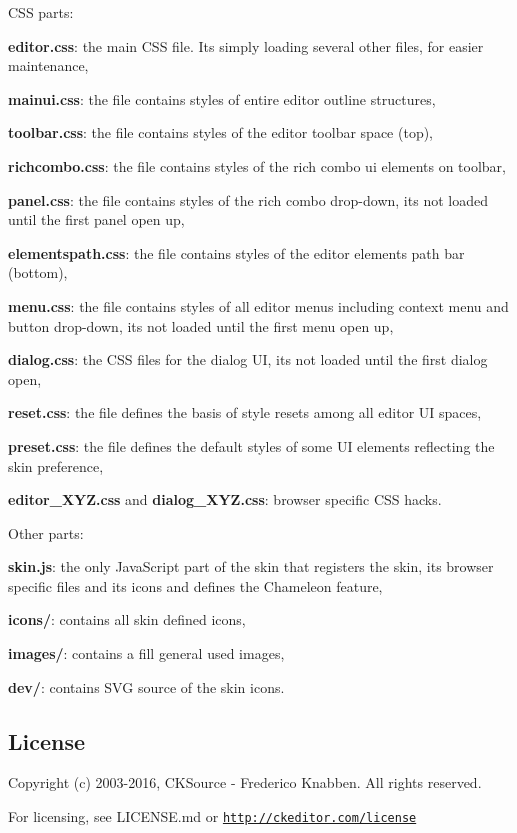 C\+SS parts\+:
\begin{DoxyItemize}
\item {\bfseries editor.\+css}\+: the main C\+SS file. It\textquotesingle{}s simply loading several other files, for easier maintenance,
\item {\bfseries mainui.\+css}\+: the file contains styles of entire editor outline structures,
\item {\bfseries toolbar.\+css}\+: the file contains styles of the editor toolbar space (top),
\item {\bfseries richcombo.\+css}\+: the file contains styles of the rich combo ui elements on toolbar,
\item {\bfseries panel.\+css}\+: the file contains styles of the rich combo drop-\/down, it\textquotesingle{}s not loaded until the first panel open up,
\item {\bfseries elementspath.\+css}\+: the file contains styles of the editor elements path bar (bottom),
\item {\bfseries menu.\+css}\+: the file contains styles of all editor menus including context menu and button drop-\/down, it\textquotesingle{}s not loaded until the first menu open up,
\item {\bfseries dialog.\+css}\+: the C\+SS files for the dialog UI, it\textquotesingle{}s not loaded until the first dialog open,
\item {\bfseries reset.\+css}\+: the file defines the basis of style resets among all editor UI spaces,
\item {\bfseries preset.\+css}\+: the file defines the default styles of some UI elements reflecting the skin preference,
\item {\bfseries editor\+\_\+\+X\+Y\+Z.\+css} and {\bfseries dialog\+\_\+\+X\+Y\+Z.\+css}\+: browser specific C\+SS hacks.
\end{DoxyItemize}

Other parts\+:
\begin{DoxyItemize}
\item {\bfseries skin.\+js}\+: the only Java\+Script part of the skin that registers the skin, its browser specific files and its icons and defines the Chameleon feature,
\item {\bfseries icons/}\+: contains all skin defined icons,
\item {\bfseries images/}\+: contains a fill general used images,
\item {\bfseries dev/}\+: contains S\+VG source of the skin icons.
\end{DoxyItemize}

\subsection*{License }

Copyright (c) 2003-\/2016, C\+K\+Source -\/ Frederico Knabben. All rights reserved.

For licensing, see L\+I\+C\+E\+N\+S\+E.\+md or \href{http://ckeditor.com/license}{\tt http\+://ckeditor.\+com/license} 